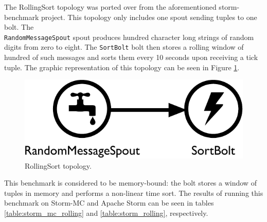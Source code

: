 \documentclass[bsc,deptreport,twoside,singlespacing,normalheadings,parskip]{infthesis}\usepackage[]{graphicx}\usepackage[]{color}
\begin{document}
The RollingSort topology was ported over from the aforementioned storm-benchmark project. This topology only includes one spout sending tuples to one bolt. The \\ \texttt{RandomMessageSpout} spout produces hundred character long strings of random digits from zero to eight. The \texttt{SortBolt} bolt then stores a rolling window of hundred of such messages and sorts them every 10 seconds upon receiving a tick tuple. The graphic representation of this topology can be seen in Figure \ref{fig:rolling_topology}.

\begin{figure}[!htb]
	\centering
	\includegraphics[scale=0.475]{pdf/rolling_topology.pdf}
	\caption{RollingSort topology.}
	\label{fig:rolling_topology}
\end{figure}

This benchmark is considered to be memory-bound: the bolt stores a window of tuples in memory and performs a non-linear time sort. The results of running this benchmark on Storm-MC and Apache Storm can be seen in tables \ref{table:storm_mc_rolling} and \ref{table:storm_rolling}, respectively.
\end{document}
